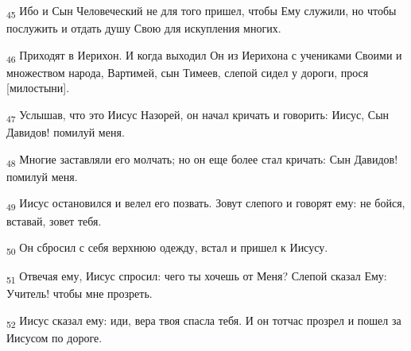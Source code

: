 \begin{tcolorbox}
\textsubscript{45} Ибо и Сын Человеческий не для того пришел, чтобы Ему служили, но чтобы послужить и отдать душу Свою для искупления многих.
\end{tcolorbox}
\begin{tcolorbox}
\textsubscript{46} Приходят в Иерихон. И когда выходил Он из Иерихона с учениками Своими и множеством народа, Вартимей, сын Тимеев, слепой сидел у дороги, прося [милостыни].
\end{tcolorbox}
\begin{tcolorbox}
\textsubscript{47} Услышав, что это Иисус Назорей, он начал кричать и говорить: Иисус, Сын Давидов! помилуй меня.
\end{tcolorbox}
\begin{tcolorbox}
\textsubscript{48} Многие заставляли его молчать; но он еще более стал кричать: Сын Давидов! помилуй меня.
\end{tcolorbox}
\begin{tcolorbox}
\textsubscript{49} Иисус остановился и велел его позвать. Зовут слепого и говорят ему: не бойся, вставай, зовет тебя.
\end{tcolorbox}
\begin{tcolorbox}
\textsubscript{50} Он сбросил с себя верхнюю одежду, встал и пришел к Иисусу.
\end{tcolorbox}
\begin{tcolorbox}
\textsubscript{51} Отвечая ему, Иисус спросил: чего ты хочешь от Меня? Слепой сказал Ему: Учитель! чтобы мне прозреть.
\end{tcolorbox}
\begin{tcolorbox}
\textsubscript{52} Иисус сказал ему: иди, вера твоя спасла тебя. И он тотчас прозрел и пошел за Иисусом по дороге.
\end{tcolorbox}
